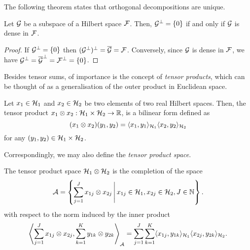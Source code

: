 The following theorem states that orthogonal decompositions are unique.

\begin{corollary}\label{thm:orthdecomp2}
  Let ${\mathcal G}$ be a subspace of a Hilbert space ${\mathcal F}$. 
  Then, ${\mathcal G}^\bot = \{0\}$ if and only if ${\mathcal G}$ is dense in ${\mathcal F}$.
\end{corollary}

\begin{proof}
  If ${\mathcal G}^\bot=\{0\}$ then $({\mathcal G}^\bot)^\bot = \overline {{\mathcal G}} = {\mathcal F}$.
  Conversely, since ${\mathcal G}$ is dense in ${\mathcal F}$, we have ${\mathcal G}^\bot = \overline{{\mathcal G}}^\bot = {\mathcal F}^\bot = \{0\}$.
\end{proof}


Besides tensor sums, of importance is the concept of \emph{tensor products}, which can be thought of as a generalisation of the outer product in Euclidean space.

\begin{definition}\label{def:tensorprod}
  Let $x_1\in{\mathcal H}_1$ and $x_2\in{\mathcal H}_2$ be two elements of two real Hilbert spaces.
  Then, the tensor product $x_1 \otimes x_2:{\mathcal H}_1\times{\mathcal H}_2\to\mathbb{R}$, is a bilinear form defined as
  \begingroup
  \setlength{\abovedisplayskip}{3pt}
  \setlength{\belowdisplayskip}{5pt}
  \[
    (x_1\otimes x_2)(y_1,y_2) = \langle x_1,y_1\rangle_{{\mathcal H}_1}\langle x_2,y_2\rangle_{{\mathcal H}_2}
  \]
  \endgroup
  for any $(y_1,y_2)\in{\mathcal H}_1\times{\mathcal H}_2$.
\end{definition}

Correspondingly, we may also define the \emph{tensor product space}.

\begin{definition}\label{def:tensprodspace}
  The tensor product space ${\mathcal H}_1\otimes{\mathcal H}_2$ is the completion of the space
  \begingroup
  \setlength{\abovedisplayskip}{8pt}
  \setlength{\belowdisplayskip}{8pt}
  \[
    {\mathcal A} = \left\{ \sum_{j=1}^J x_{1j} \otimes x_{2j} \,\Bigg\vert\, x_{1j}\in{\mathcal H}_1, x_{2j}\in{\mathcal H}_2, J \in \mathbb{N} \right\}.
  \]
  \endgroup
  with respect to the norm induced by the inner product
  \[
    \left\langle  \sum_{j=1}^J x_{1j} \otimes x_{2j},  \sum_{k=1}^K y_{1k} \otimes y_{2k} \right\rangle_{\mathcal A} = \sum_{j=1}^J\sum_{k=1}^K \langle x_{1j},y_{1k}\rangle_{{\mathcal H}_1} \langle x_{2j},y_{2k}\rangle_{{\mathcal H}_2}.
  \]
\end{definition}

